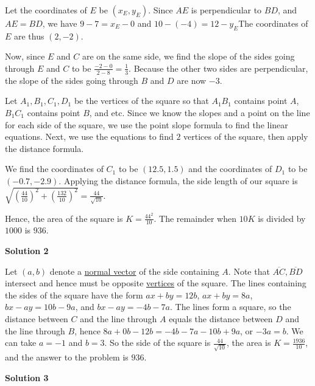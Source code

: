 \begin{enumerate}
 Let the coordinates of $E$ be $(x_E,y_E)$. Since $AE$ is perpendicular to $BD$, and $AE = BD$, we have $9 - 7 = x_E - 0$ and $10 - ( - 4) = 12 - y_E$The coordinates of $E$ are thus $(2, - 2)$.

 Now, since $E$ and $C$ are on the same side, we find the slope of the sides going through $E$ and $C$ to be $\frac { - 2 - 0}{2 - 8} = \frac {1}{3}$. Because the other two sides are perpendicular, the slope of the sides going through $B$ and $D$ are now $- 3$.

 Let $A_1,B_1,C_1,D_1$ be the vertices of the square so that $A_1B_1$ contains point $A$, $B_1C_1$ contains point $B$, and etc. Since we know the slopes and a point on the line for each side of the square, we use the point slope formula to find the linear equations. Next, we use the equations to find $2$ vertices of the square, then apply the distance formula. 

 We find the coordinates of $C_1$ to be $(12.5,1.5)$ and the coordinates of $D_1$ to be $( - 0.7, - 2.9)$. Applying the distance formula, the side length of our square is $\sqrt {\left( \frac {44}{10} \right)^2 + \left( \frac {132}{10} \right)^2} = \frac {44}{\sqrt {10}}$.

 Hence, the area of the square is $K = \frac {44^2}{10}$. The remainder when $10K$ is divided by $1000$ is $936$.

 



\textbf{Solution 2}

Let $(a,b)$ denote a \href{https://artofproblemsolving.com/wiki/index.php?title=Normal\_vector&action=edit&redlink=1}{normal vector} of the side containing $A$. Note that $\overline{AC}, \overline{BD}$ intersect and hence must be opposite \href{https://artofproblemsolving.com/wiki/index.php?title=Vertex}{vertices} of the square. The lines containing the sides of the square have the form $ax+by=12b$, $ax+by=8a$, $bx-ay=10b-9a$, and $bx-ay=-4b-7a$. The lines form a square, so the distance between $C$ and the line through $A$ equals the distance between $D$ and the line through $B$, hence $8a+0b-12b=-4b-7a-10b+9a$, or $-3a=b$. We can take $a=-1$ and $b=3$. So the side of the square is $\frac{44}{\sqrt{10}}$, the area is $K=\frac{1936}{10}$, and the answer to the problem is $\boxed{936}$.

 



\textbf{Solution 3}


\end{enumerate}
